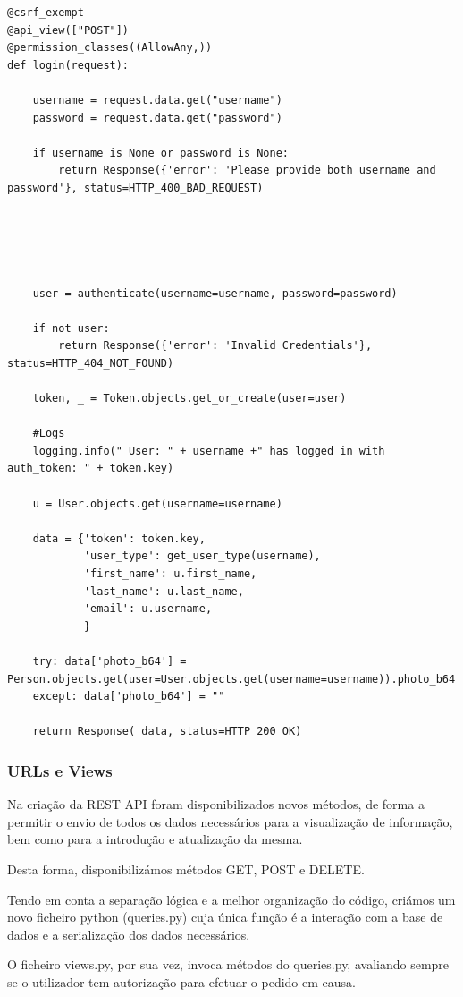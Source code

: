 \documentclass[12pt]{article}
\begin{document}
\begin{lstlisting}[caption={Tratamento da autenticação de um utilizador na plataforma},captionpos=b]
@csrf_exempt
@api_view(["POST"])
@permission_classes((AllowAny,))
def login(request):

    username = request.data.get("username")
    password = request.data.get("password")
    
    if username is None or password is None:
        return Response({'error': 'Please provide both username and password'}, status=HTTP_400_BAD_REQUEST)
        
    
    
    
    
    user = authenticate(username=username, password=password)
    
    if not user:
        return Response({'error': 'Invalid Credentials'}, status=HTTP_404_NOT_FOUND)
        
    token, _ = Token.objects.get_or_create(user=user)

    #Logs
    logging.info(" User: " + username +" has logged in with auth_token: " + token.key)

    u = User.objects.get(username=username)

    data = {'token': token.key,
            'user_type': get_user_type(username),
            'first_name': u.first_name,
            'last_name': u.last_name,
            'email': u.username,
            }

    try: data['photo_b64'] = Person.objects.get(user=User.objects.get(username=username)).photo_b64
    except: data['photo_b64'] = ""

    return Response( data, status=HTTP_200_OK)
\end{lstlisting}

\subsubsection{URLs e Views}
Na criação da REST API foram disponibilizados novos métodos, de forma a permitir o envio de todos os dados necessários para a visualização de informação, bem como para a introdução e atualização da mesma.
\par Desta forma, disponibilizámos métodos GET, POST e DELETE.
\par Tendo em conta a separação lógica e a melhor organização do código, criámos um novo ficheiro python (queries.py) cuja única função é a interação com a base de dados e a serialização dos dados necessários.
\par O ficheiro views.py, por sua vez, invoca métodos do queries.py, avaliando sempre se o utilizador tem autorização para efetuar o pedido em causa.
\end{document}
